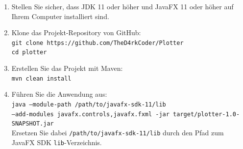 \documentclass[a4paper]{article}
\begin{document}
\begin{enumerate}
	\item Stellen Sie sicher, dass JDK 11 oder höher und JavaFX 11 oder höher auf Ihrem Computer installiert sind.
	\item Klone das Projekt-Repository von GitHub:\\
	      \texttt{git clone https://github.com/TheD4rkCoder/Plotter}\\
	      \texttt{cd plotter}
	\item Erstellen Sie das Projekt mit Maven:\\
	      \texttt{mvn clean install}
	\item Führen Sie die Anwendung aus:\\
	      \texttt{java --module-path /path/to/javafx-sdk-11/lib\\ --add-modules javafx.controls,javafx.fxml -jar target/plotter-1.0-SNAPSHOT.jar}\\
	      Ersetzen Sie dabei \texttt{/path/to/javafx-sdk-11/lib} durch den Pfad zum JavaFX SDK \texttt{lib}-Verzeichnis.
\end{enumerate}
\end{document}
